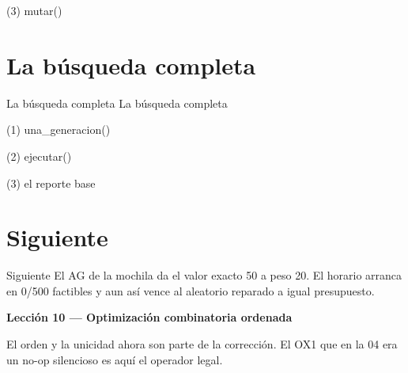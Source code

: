 \begin{frame}[fragile]{(3) mutar()}

\end{frame}


\section{La búsqueda completa}

\begin{frame}{La búsqueda completa}
La búsqueda completa
\end{frame}

\begin{frame}[fragile]{(1) una\_generacion()}

\end{frame}

\begin{frame}[fragile]{(2) ejecutar()}

\end{frame}

\begin{frame}[fragile]{(3) el reporte base}

\end{frame}


\section{Siguiente}

\begin{frame}{Siguiente}
El AG de la mochila da el valor exacto 50 a peso 20. El horario arranca en 0/500 factibles y aun así vence al aleatorio reparado a igual presupuesto.

\vspace{0.8em}
\textbf{Lección 10 --- Optimización combinatoria ordenada}

El orden y la unicidad ahora son parte de la corrección. El OX1 que en la 04 era un no-op silencioso es aquí el operador legal.
\end{frame}

